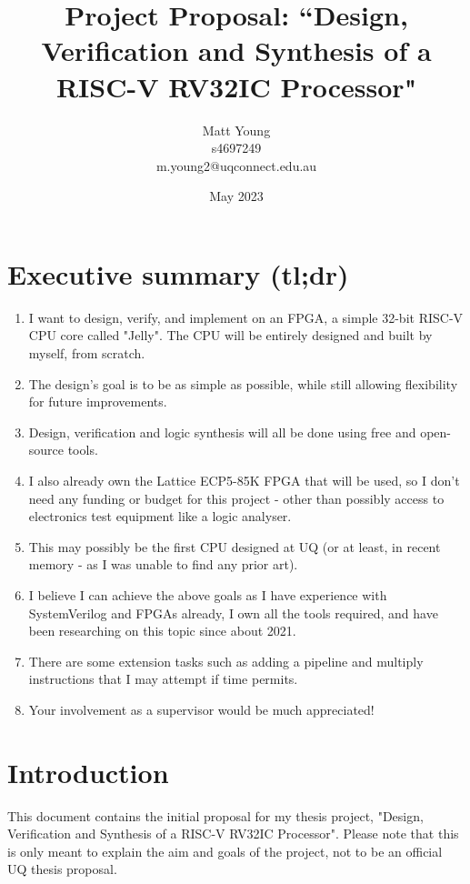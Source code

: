 \documentclass{article}
\title{\textbf{Project Proposal: ``Design, Verification and Synthesis of a RISC-V RV32IC Processor"}}
\author{Matt Young \\ s4697249 \\ m.young2@uqconnect.edu.au}
\date{May 2023}
\begin{document}
\maketitle

\tableofcontents

\section{Executive summary (tl;dr)}
\begin{enumerate}
	\item I want to design, verify, and implement on an FPGA, a simple 32-bit RISC-V CPU core called "Jelly". The CPU
	      will be entirely designed and built by myself, from scratch.
	\item The design's goal is to be as simple as possible, while still allowing flexibility for future improvements.
	\item Design, verification and logic synthesis will all be done using free and open-source tools.
	\item I also already own the Lattice ECP5-85K FPGA that will be used, so I don't need any funding or budget for
	      this project - other than possibly access to electronics test equipment like a logic analyser.
	\item This may possibly be the first CPU designed at UQ (or at least, in recent memory - as I was unable to find
	      any prior art).
	\item I believe I can achieve the above goals as I have experience with SystemVerilog and FPGAs already, I own all
	      the tools required, and have been researching on this topic since about 2021.
	\item There are some extension tasks such as adding a pipeline and multiply instructions that I may attempt if time
	      permits.
	\item Your involvement as a supervisor would be much appreciated!
\end{enumerate}

\section{Introduction}
This document contains the initial proposal for my thesis project, "Design, Verification and Synthesis of a
RISC-V RV32IC Processor". Please note that this is only meant to explain the aim and goals of the project,
not to be an official UQ thesis proposal.

\end{document}

